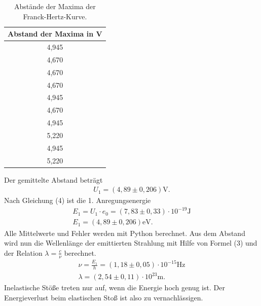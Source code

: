 \begin{table}[H]
  \centering
  \caption{Abstände der Maxima der Franck-Hertz-Kurve.}
  \label{tab:Parameter}
  \begin{tabular}{c }
    \toprule
     Abstand der Maxima in V \\
    \bottomrule
     4,945\\
     4,670\\
     4,670\\
     4,670\\
     4,945\\
    4,670\\
    4,945\\
    5,220\\
     4,945\\
    5,220\\
   \bottomrule
  \end{tabular}
\end{table}

Der gemittelte Abstand beträgt
\begin{align*}
U_1 = (4,89 \pm 0,206) \si{\V}.
\end{align*}
Nach Gleichung (4) ist die 1. Anregungsenergie
\begin{align*}
E_1 = U_1 \cdot e_0 = (7,83 \pm 0,33)\cdot 10^{-19} \si{\J} \\
E_1 = (4,89 \pm 0,206) \si{\eV}.
\end{align*}
Alle Mittelwerte und Fehler werden mit Python berechnet.
Aus dem Abstand wird nun die Wellenlänge der emittierten Strahlung mit Hilfe von Formel (3) und der Relation $\lambda = \frac{c}{\nu} $ berechnet.
\begin{align*}
\nu = \frac{E_1}{h} = (1,18 \pm 0,05)\cdot 10^{-15} \si{\Hz}\\
\lambda = (2,54 \pm 0,11)\cdot 10^{23} \si{\m}.
\end{align*}
Inelastische Stöße treten nur auf, wenn die Energie hoch genug ist.
Der Energieverlust beim elastischen Stoß ist also zu vernachlässigen.

